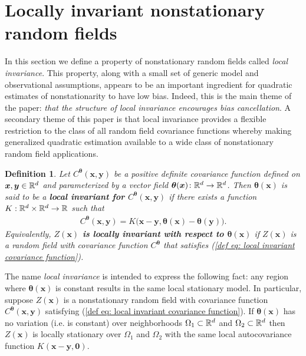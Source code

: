 \documentclass[10pt,noinfoline]{imsart}
\newtheorem{definition}{Definition}
\newcommand{\bs}{\boldsymbol}
\begin{document}
\section{Locally invariant nonstationary random fields}
\label{section: local invariant}

In this section we define a property of nonstationary random fields called \textit{local invariance}. This property,  along with a small set of generic model and observational assumptions, appears to be an important ingredient for quadratic estimates of nonstationarity to have low bias. Indeed, this is the main theme of the paper: {\it that the structure of local invariance encourages bias cancellation}. A secondary theme of this paper is that local invariance provides a flexible restriction to the class of all random field covariance functions whereby making generalized quadratic estimation available to a wide class of nonstationary random field applications.



\begin{definition}
\label{Definition 1}
Let $C^{\bs \theta}(\bs x, \bs y)$ be a positive definite covariance function defined on $\bs x, \bs y\in\Bbb R^d$ and parameterized by a vector field $\bs \theta(\bs x)\colon\Bbb R^d\rightarrow \Bbb R^d$.
Then $\bs \theta(\bs x)$ is said to be a \textbf{local invariant for $C^{\bs \theta}(\bs x,\bs y)$} if there exists a function \mbox{$K:\Bbb R^d\times \Bbb R^d \rightarrow \Bbb R$} such that
\begin{align}\label{def eq: local invariant covariance function}
C^{\bs \theta}(\bs x,\bs y) = K\big(\bs x-\bs y,\bs \theta(\bs x) -  \bs \theta(\bs y)\big).
\end{align}
Equivalently, \textbf{$Z(\bs x)$ is  locally invariant with respect to $\bs\theta(\bs x)$} if $Z(\bs x)$ is a random field  with covariance function $C^{\bs \theta}$ that satisfies (\ref{def eq: local invariant covariance function}).
\end{definition}




The name \textit{local invariance} is intended to express the following fact: any region where $\bs \theta(\bs x)$ is constant results in the same local stationary model. In particular, suppose $Z(\bs x)$ is a nonstationary random field with covariance function $C^{\bs \theta}(\bs x, \bs y)$ satisfying (\ref{def eq: local invariant covariance function}). If $\bs \theta(\bs x)$ has no variation (i.e. is constant) over neighborhoods $\Omega_1\subset \Bbb R^d$ and $\Omega_2\subset \Bbb R^d$ then $Z(\bs x)$ is locally stationary over $\Omega_1$ and $\Omega_2$ with the same local autocovariance function $K(\bs x-\bs y, \bs 0)$.
\end{document}
